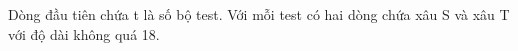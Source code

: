 Dòng đầu tiên chứa t là số bộ test. Với mỗi test có hai dòng chứa xâu S và xâu T với độ dài không quá 18.